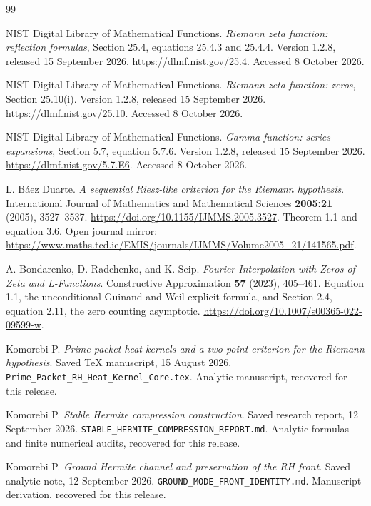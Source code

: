 \begin{thebibliography}{99}

NIST Digital Library of Mathematical Functions.
\emph{Riemann zeta function: reflection formulas}, Section 25.4,
equations 25.4.3 and 25.4.4. Version 1.2.8, released 15 September 2026.
\url{https://dlmf.nist.gov/25.4}.
Accessed 8 October 2026.

NIST Digital Library of Mathematical Functions.
\emph{Riemann zeta function: zeros}, Section 25.10(i).
Version 1.2.8, released 15 September 2026.
\url{https://dlmf.nist.gov/25.10}.
Accessed 8 October 2026.

NIST Digital Library of Mathematical Functions.
\emph{Gamma function: series expansions}, Section 5.7,
equation 5.7.6. Version 1.2.8, released 15 September 2026.
\url{https://dlmf.nist.gov/5.7.E6}.
Accessed 8 October 2026.

L. B\'aez Duarte.
\emph{A sequential Riesz-like criterion for the Riemann hypothesis}.
International Journal of Mathematics and Mathematical Sciences
\textbf{2005:21} (2005), 3527--3537.
\url{https://doi.org/10.1155/IJMMS.2005.3527}.
Theorem 1.1 and equation 3.6.
Open journal mirror:
\url{https://www.maths.tcd.ie/EMIS/journals/IJMMS/Volume2005_21/141565.pdf}.

A. Bondarenko, D. Radchenko, and K. Seip.
\emph{Fourier Interpolation with Zeros of Zeta and L-Functions}.
Constructive Approximation \textbf{57} (2023), 405--461.
Equation 1.1, the unconditional Guinand and Weil explicit formula,
and Section 2.4, equation 2.11, the zero counting asymptotic.
\url{https://doi.org/10.1007/s00365-022-09599-w}.

Komorebi P.
\emph{Prime packet heat kernels and a two point criterion for the Riemann hypothesis}.
Saved TeX manuscript, 15 August 2026.
\texttt{Prime\_Packet\_RH\_Heat\_Kernel\_Core.tex}.
Analytic manuscript, recovered for this release.

Komorebi P.
\emph{Stable Hermite compression construction}.
Saved research report, 12 September 2026.
\texttt{STABLE\_HERMITE\_COMPRESSION\_REPORT.md}.
Analytic formulas and finite numerical audits, recovered for this release.

Komorebi P.
\emph{Ground Hermite channel and preservation of the RH front}.
Saved analytic note, 12 September 2026.
\texttt{GROUND\_MODE\_FRONT\_IDENTITY.md}.
Manuscript derivation, recovered for this release.


\end{thebibliography}

